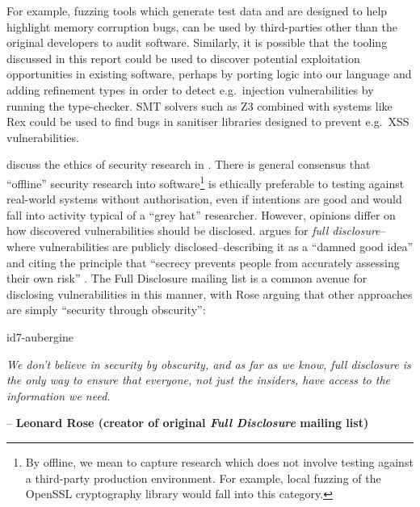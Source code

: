\documentclass[a4paper,openany,12pt]{book}
\begin{document}
For example, fuzzing tools which generate test data and are designed to help highlight memory corruption bugs, can be
used by third-parties other than the original developers to audit software.
Similarly, it is possible that the tooling discussed in this report could be used to discover potential exploitation
opportunities in existing software, perhaps by porting logic into our language and adding refinement types in order to
detect e.g.\ injection vulnerabilities by running the type-checker.
SMT solvers such as Z3 combined with systems like Rex could be used to find bugs in sanitiser libraries designed to
prevent e.g.\ XSS vulnerabilities.

\citeauthor{harper2018gray} discuss the ethics of security research in \citet{harper2018gray}.
There is general consensus that ``offline'' security research into software\footnote{By offline, we mean to capture research which does not involve testing against a third-party production environment.
For example, local fuzzing of the OpenSSL cryptography library would fall into this category.} is ethically preferable
to testing against real-world systems without authorisation, even if intentions are good and would fall into activity
typical of a ``grey hat'' researcher.
However, opinions differ on how discovered vulnerabilities should be disclosed. \citeauthor{schneier2007fd} argues for
\textit{full disclosure}--where vulnerabilities are publicly disclosed--describing it as a ``damned good
idea'' and citing the principle that ``secrecy prevents people from accurately assessing their own risk'' \citep{schneier2007fd}.
The Full Disclosure mailing list is a common avenue for disclosing vulnerabilities in this manner, with Rose arguing
that other approaches are simply ``security through obscurity'':

\begin{mdframed}
    \begin{leftbar}{id7-aubergine}
        \vspace{0.25em}

        \textit{We don't believe in security by obscurity, and as far as we know, full disclosure is the only way to ensure that everyone, not just the insiders, have access to the information we need.} \\
        \vspace{0.25em}
    \end{leftbar}
    \vspace{-0.2em}
    \hfill \textcolor{id7-aubergine}{\small \sffamily -- \textbf{Leonard Rose (creator of original \textit{Full Disclosure} mailing list)}}
    \rmfamily
\end{mdframed}
\end{document}
